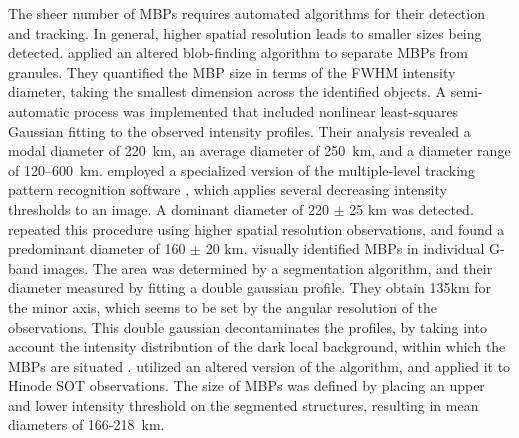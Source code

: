 \documentclass{emulateapj}
\begin{document}
The sheer number of MBPs requires automated algorithms for their detection and tracking. In general, higher spatial resolution leads to smaller sizes being detected.  \cite{Ber95} applied an altered blob-finding algorithm to separate MBPs from granules. They quantified the MBP size in terms of the FWHM intensity diameter, taking the smallest dimension across the identified objects.  A semi-automatic process was implemented that included nonlinear least-squares Gaussian fitting to the observed intensity profiles. Their analysis revealed  a modal diameter of 220~km, an average diameter of 250~km, and a diameter range of 120--600~km. \cite{Bov03} employed a specialized version of the multiple-level tracking pattern recognition software \citep[][]{Bov01}, which applies several decreasing intensity thresholds to an image.  
A dominant diameter of 220 $\pm$ 25 km was detected.  \cite{Wie04} repeated this procedure using higher spatial resolution observations, and found a predominant diameter of 160 $\pm$ 20 km. \cite{Alm04} visually identified MBPs in individual G-band images. The area was determined by a segmentation algorithm, and their diameter measured by fitting a double gaussian profile. They obtain 135km for the minor axis, which seems to be set by the angular resolution of the observations. This double gaussian decontaminates the profiles, by taking into account the intensity distribution of the dark local background, within which the MBPs are situated \citep[][]{Tit96}. \cite{Utz09} utilized an altered version of the \cite{Bov01} algorithm, and applied it to Hinode SOT observations.  The size of MBPs was defined by placing an upper and lower intensity threshold on the segmented structures, resulting in mean diameters of 166-218~km.  %
\end{document}
